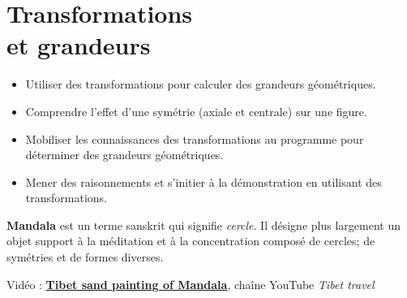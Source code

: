 \themaM
\graphicspath{{../../S30_Transformations_et_grandeurs/Images/}}
\usetikzlibrary{calc}
\chapter{Transformations\\et grandeurs}
\label{S30}

\newcommand{\Syst}[2]{\renewcommand{\arraystretch}{1}\left\{\begin{array}{ccccc} #1\\ #2 \end{array}\right.}
    
    
\begin{prerequis}
   \begin{itemize}
      \item[\com] Utiliser des transformations pour calculer des grandeurs géométriques.
      \item[\com] Comprendre l’effet d’une symétrie (axiale et centrale) sur une figure.
      \item[\com] Mobiliser les connaissances des transformations au programme pour déterminer des grandeurs géométriques.
      \item[\com] Mener des raisonnements et s’initier à la démonstration en utilisant des transformations.
   \end{itemize}
\end{prerequis}

\vfill

\begin{debat}
   {\bf Mandala} est un terme sanskrit qui signifie {\it cercle}. Il désigne plus largement un objet support à la méditation et à la concentration composé de cercles; de symétries et de formes diverses. \\
   \begin{center}
   \end{center}
   \bigskip
   \begin{cadre}[B2][F4]
      \begin{center}
         Vidéo : \href{https://www.youtube.com/watch?time_continue=262&v=bgoHUH-_yWo&feature=emb_logo}{\bf Tibet sand painting of Mandala}, chaîne YouTube {\it Tibet travel}
      \end{center}
   \end{cadre}
\end{debat}

